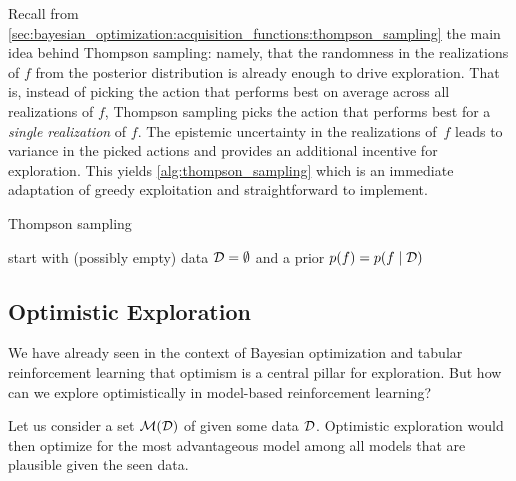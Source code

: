 Recall from \cref{sec:bayesian_optimization:acquisition_functions:thompson_sampling} the main idea behind Thompson sampling: namely, that the randomness in the realizations of $f$ from the posterior distribution is already enough to drive exploration.
That is, instead of picking the action that performs best on average across all realizations of $f$, Thompson sampling picks the action that performs best for a \emph{single realization} of $f$.
The epistemic uncertainty in the realizations of~$f$ leads to variance in the picked actions and provides an additional incentive for exploration.
This yields \cref{alg:thompson_sampling} which is an immediate adaptation of greedy exploitation and straightforward to implement.

\begin{algorithm}
  \caption{Thompson sampling}\label{alg:thompson_sampling}
  start with (possibly empty) data $\mathcal{D} = \emptyset$ and a prior $p(f) = p(f \mid \mathcal{D})$\;
\end{algorithm}

\subsection{Optimistic Exploration}\label{sec:mbarl:exploration:optimistic}

We have already seen in the context of Bayesian optimization and tabular reinforcement learning that optimism is a central pillar for exploration.
But how can we explore optimistically in model-based reinforcement learning?

Let us consider a set $\mathcal{M}(\mathcal{D})$ of  given some data $\mathcal{D}$.
Optimistic exploration would then optimize for the most advantageous model among all models that are plausible given the seen data.

